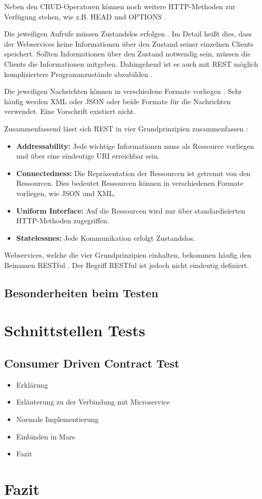 \documentclass{llncs}
\begin{document}
Neben den CRUD-Operatoren können noch weitere HTTP-Methoden zur Verfügung stehen, wie z.B. HEAD und OPTIONS \cite{porres2011modeling}.

Die jeweiligen Aufrufe müssen Zustandslos erfolgen \cite{reza2010framework, porres2011modeling, kao2013performance}. Im Detail heißt dies, dass der Webservices keine Informationen über den Zustand seiner einzelnen Clients speichert. Sollten Informationen über den Zustand notwendig sein, müssen die Clients die Informationen mitgeben. Dahingehend ist es auch mit REST möglich kompliziertere Programmzustände abzubilden \cite{porres2011modeling}.

Die jeweiligen Nachrichten können in verschiedene Formate vorliegen \cite{reza2010framework}. Sehr häufig werden XML oder JSON oder beide Formate für die Nachrichten verwendet. Eine Vorschrift existiert nicht.

Zusammenfassend lässt sich REST in vier Grundprinzipien zusammenfassen \citep{porres2011modeling}: 

\begin{itemize}
\item \textbf{Addressability: } Jede wichtige Informationen muss als Ressource vorliegen und über eine eindeutige URI erreichbar sein.
\item \textbf{Connectedness: } Die Repräsentation der Ressourcen ist getrennt von den Ressourcen. Dies bedeutet Ressourcen können in verschiedenen Formate vorliegen, wie JSON und XML.
\item \textbf{Uniform Interface: } Auf die Ressourcen wird nur über standardisierten HTTP-Methoden zugegriffen.
\item \textbf{Statelessnes: } Jede Kommunikation erfolgt Zustandslos.
\end{itemize}

Webservices, welche die vier Grundprinzipien einhalten, bekommen häufig den Beinamen RESTful \citep{porres2011modeling}. Der Begriff RESTful ist jedoch nicht eindeutig definiert.  

\subsection{Besonderheiten beim Testen}
\section{Schnittstellen Tests}
\subsection{Consumer Driven Contract Test}
\begin{itemize}
\item Erklärung
\item Erläuterung zu der Verbindung mit Microservice
\item Normale Implementierung
\item Einbinden in Mars
\item Fazit
\end{itemize}
\section{Fazit}




\end{document}
